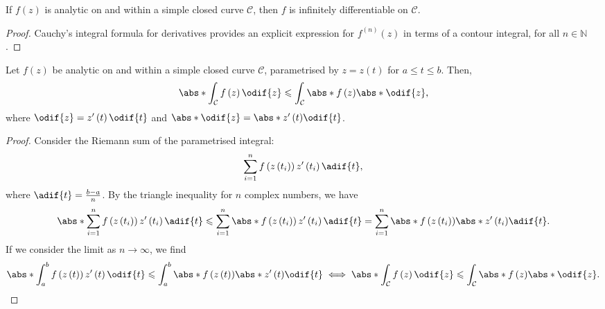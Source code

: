 \documentclass{article}
\begin{document}
\begin{corollary}
    If \(f\left( z \right)\) is analytic on and within a simple closed
    curve \(\mathcal{C}\), then \(f\) is infinitely differentiable on
    \(\mathcal{C}\).
\end{corollary}
\begin{proof}
    Cauchy's integral formula for derivatives provides an explicit
    expression for \(f^{\left( n \right)}\left( z \right)\) in terms
    of a contour integral, for all \(n \in \mathbb{N}\).
\end{proof}
\begin{theorem}
    Let \(f\left( z \right)\) be analytic on and within a simple closed
    curve \(\mathcal{C}\), parametrised by \(z = z\left( t \right)\) for
    \(a \leqslant t \leqslant b\). Then,
    \begin{equation*}
        \abs*{\int_{\mathcal{C}} f\left( z \right) \odif{z}} \leqslant \int_{\mathcal{C}} \abs*{f\left( z \right)} \abs*{\odif{z}},
    \end{equation*}
    where \(\odif{z} = z'\left( t \right) \odif{t}\) and
    \(\abs*{\odif{z}} = \abs*{z'\left( t \right)} \odif{t}\).
\end{theorem}
\begin{proof}
    Consider the Riemann sum of the parametrised integral:
    \begin{equation*}
        \sum_{i = 1}^n f\left( z\left( t_i \right) \right) z'\left( t_i \right) \adif{t},
    \end{equation*}
    where \(\adif{t} = \frac{b - a}{n}\). By the triangle inequality for
    \(n\) complex numbers, we have
    \begin{equation*}
        \abs*{\sum_{i = 1}^n f\left( z\left( t_i \right) \right) z'\left( t_i \right) \adif{t}} \leqslant \sum_{i = 1}^n \abs*{f\left( z\left( t_i \right) \right) z'\left( t_i \right) \adif{t}} = \sum_{i = 1}^n \abs*{f\left( z\left( t_i \right) \right)} \abs*{z'\left( t_i \right)} \adif{t}.
    \end{equation*}
    If we consider the limit as \(n \to \infty\), we find
    \begin{equation*}
        \abs*{\int_a^b f\left( z\left( t \right) \right) z'\left( t \right) \odif{t}} \leqslant \int_a^b \abs*{f\left( z\left( t \right) \right)} \abs*{z'\left( t \right)} \odif{t} \iff \abs*{\int_{\mathcal{C}} f\left( z \right) \odif{z}} \leqslant \int_{\mathcal{C}} \abs*{f\left( z \right)} \abs*{\odif{z}}.
    \end{equation*}
\end{proof}
\end{document}
